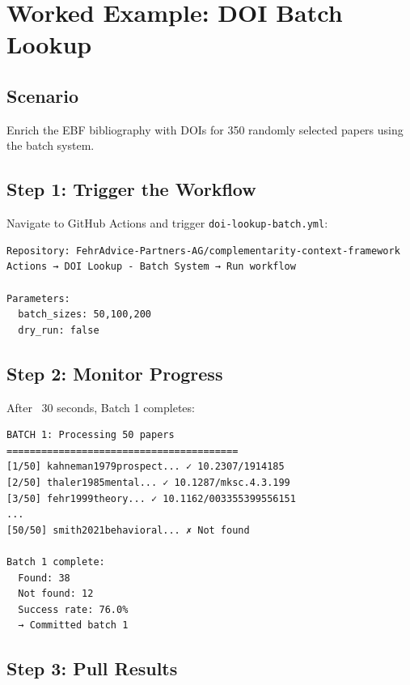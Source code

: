 \section{Worked Example: DOI Batch Lookup}
\label{sec:api-worked-example}

\subsection{Scenario}

Enrich the EBF bibliography with DOIs for 350 randomly selected papers using the batch system.

\subsection{Step 1: Trigger the Workflow}

Navigate to GitHub Actions and trigger \texttt{doi-lookup-batch.yml}:

\begin{verbatim}
Repository: FehrAdvice-Partners-AG/complementarity-context-framework
Actions → DOI Lookup - Batch System → Run workflow

Parameters:
  batch_sizes: 50,100,200
  dry_run: false
\end{verbatim}

\subsection{Step 2: Monitor Progress}

After ~30 seconds, Batch 1 completes:

\begin{verbatim}
BATCH 1: Processing 50 papers
========================================
[1/50] kahneman1979prospect... ✓ 10.2307/1914185
[2/50] thaler1985mental... ✓ 10.1287/mksc.4.3.199
[3/50] fehr1999theory... ✓ 10.1162/003355399556151
...
[50/50] smith2021behavioral... ✗ Not found

Batch 1 complete:
  Found: 38
  Not found: 12
  Success rate: 76.0%
  → Committed batch 1
\end{verbatim}

\subsection{Step 3: Pull Results}

